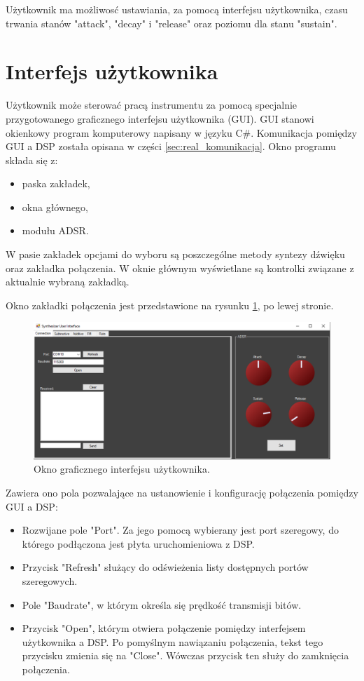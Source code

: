 Użytkownik ma możliwosć ustawiania, za pomocą interfejsu użytkownika, czasu trwania stanów "attack", "decay" i "release" oraz poziomu dla stanu "sustain".

\section{Interfejs użytkownika}
Użytkownik może sterować pracą instrumentu za pomocą specjalnie przygotowanego graficznego interfejsu użytkownika (GUI). GUI stanowi okienkowy program komputerowy napisany w języku C\#. Komunikacja pomiędzy GUI a DSP została opisana w części \ref{sec:real_komunikacja}. Okno programu składa się z:
\begin{itemize}
	\item paska zakładek,
	\item okna głównego,
	\item modułu ADSR.
\end{itemize}
W pasie zakładek opcjami do wyboru są poszczególne metody syntezy dźwięku oraz zakładka połączenia.
W oknie głównym wyświetlane są kontrolki związane z aktualnie wybraną zakładką. 

Okno zakładki połączenia jest przedstawione na rysunku \ref{rys:real_gui}, po lewej stronie. 
\begin{figure}[H]
	\centering
	\includegraphics[width=16cm]{./grafiki/real_gui}
	\captionsetup{justification=centering}
	\caption{Okno graficznego interfejsu użytkownika.}
	\label{rys:real_gui}
\end{figure}
Zawiera ono pola pozwalające na ustanowienie i konfigurację połączenia pomiędzy GUI a DSP:
\begin{itemize}
	\item Rozwijane pole "Port". Za jego pomocą wybierany jest port szeregowy, do którego podłączona jest płyta uruchomieniowa z DSP.
	\item Przycisk "Refresh" służący do odświeżenia listy dostępnych portów szeregowych.
	\item Pole "Baudrate", w którym określa się prędkość transmisji bitów. 
	\item Przycisk "Open", którym otwiera połączenie pomiędzy interfejsem użytkownika a DSP. Po pomyślnym nawiązaniu połączenia, tekst tego przycisku zmienia się na "Close". Wówczas przycisk ten służy do zamknięcia połączenia.
\end{itemize} 



